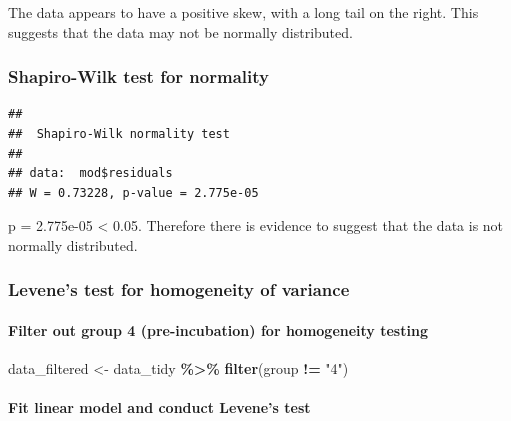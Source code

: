 \documentclass[
]{article}
\newenvironment{Shaded}{\begin{snugshade}}{\end{snugshade}}
\newcommand{\FunctionTok}[1]{\textcolor[rgb]{0.13,0.29,0.53}{\textbf{#1}}}
\newcommand{\NormalTok}[1]{#1}
\newcommand{\OtherTok}[1]{\textcolor[rgb]{0.56,0.35,0.01}{#1}}
\newcommand{\SpecialCharTok}[1]{\textcolor[rgb]{0.81,0.36,0.00}{\textbf{#1}}}
\newcommand{\StringTok}[1]{\textcolor[rgb]{0.31,0.60,0.02}{#1}}
\begin{document}
The data appears to have a positive skew, with a long tail on the right.
This suggests that the data may not be normally distributed.

\subsubsection{Shapiro-Wilk test for
normality}\label{shapiro-wilk-test-for-normality}

\begin{Shaded}
\end{Shaded}

\begin{verbatim}
## 
##  Shapiro-Wilk normality test
## 
## data:  mod$residuals
## W = 0.73228, p-value = 2.775e-05
\end{verbatim}

p = 2.775e-05 \textless{} 0.05. Therefore there is evidence to suggest
that the data is not normally distributed.

\subsubsection{Levene's test for homogeneity of
variance}\label{levenes-test-for-homogeneity-of-variance}

\paragraph{Filter out group 4 (pre-incubation) for homogeneity
testing}\label{filter-out-group-4-pre-incubation-for-homogeneity-testing}

\begin{Shaded}
\begin{Highlighting}[]
\NormalTok{data\_filtered }\OtherTok{\textless{}{-}}\NormalTok{ data\_tidy }\SpecialCharTok{\%\textgreater{}\%} \FunctionTok{filter}\NormalTok{(group }\SpecialCharTok{!=} \StringTok{"4"}\NormalTok{)}
\end{Highlighting}
\end{Shaded}

\paragraph{Fit linear model and conduct Levene's
test}\label{fit-linear-model-and-conduct-levenes-test}
\end{document}
